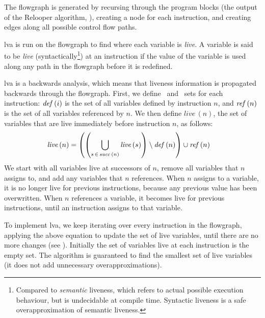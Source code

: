 \documentclass[00-main.tex]{subfiles}
\begin{document}
The flowgraph is generated by recursing through the program blocks (the output of the Relooper algorithm, ), creating a node for each instruction, and creating edges along all possible control flow paths.

\Gls{lva} is run on the flowgraph to find where each variable is \emph{live}.
A variable is said to be \emph{live} (syntactically\footnote{Compared to \emph{semantic} liveness, which refers to actual possible execution behaviour, but is undecidable at compile time. Syntactic liveness is a safe overapproximation of semantic liveness.}) at an instruction if the value of the variable is used along any path in the flowgraph before it is redefined.

\Gls{lva} is a backwards analysis, which means that liveness information is propagated backwards through the flowgraph.
First, we define \lvadef\ and \lvaref\ sets for each instruction: $\mathit{def}\,(i)$ is the set of all variables defined by instruction $n$, and $\mathit{ref}\,(n)$ is the set of all variables referenced by $n$.
We then define $\mathit{live}\,(n)$, the set of variables that are live immediately before instruction $n$, as follows:
\begin{align*}
  \mathit{live}\,(n) &= \left( \left( \bigcup_{s \,\in\, \mathit{succ}\,(n)} \mathit{live}\,(s) \right) \setminus \mathit{def}\,(n) \right) \cup \mathit{ref}\,(n)
\end{align*}
We start with all variables live at successors of $n$, remove all variables that $n$ assigns to, and add any variables that $n$ references.
When $n$ assigns to a variable, it is no longer live for previous instructions, because any previous value has been overwritten.
When $n$ references a variable, it becomes live for previous instructions, until an instruction assigns to that variable.

To implement \gls{lva}, we keep iterating over every instruction in the flowgraph, applying the above equation to update the set of live variables, until there are no more changes (see ).
Initially the set of variables live at each instruction is the empty set.
The algorithm is guaranteed to find the smallest set of live variables (it does not add unnecessary overapproximations).
\end{document}
